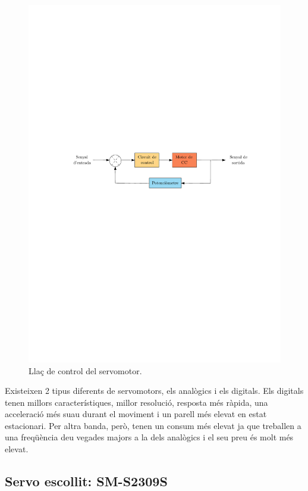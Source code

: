 \begin{figure}[H]
	\centering
	\includegraphics{flux_servo}
	\caption{Llaç de control del servomotor.}
	\label{fig:llacservo}
\end{figure}

Existeixen 2 tipus diferents de servomotors, els analògics i els digitals. Els digitals tenen millors característiques, millor resolució, resposta més ràpida, una acceleració més suau durant el moviment i un parell més elevat en estat estacionari. Per altra banda, però, tenen un consum més elevat ja que treballen a una freqüència deu vegades majors a la dels analògics i el seu preu és molt més elevat. 

\subsection{Servo escollit: SM-S2309S}

